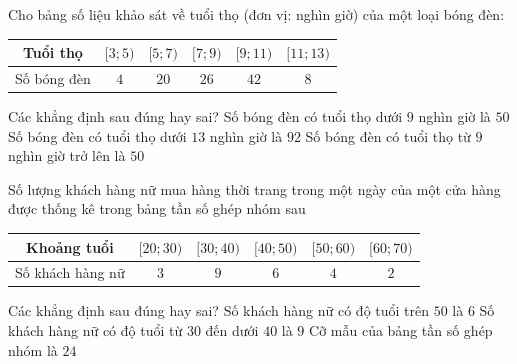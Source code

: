 \begin{ex}%
Cho bảng số liệu khảo sát về tuổi thọ (đơn vị: nghìn giờ) của một loại bóng đèn:
\begin{longtable}{|c|c|c|c|c|c|}
\hline Tuổi thọ &$[3 ; 5)$&$[5 ; 7)$&$[7 ; 9)$&$[9 ; 11)$&$[11 ; 13)$\\
\hline Số bóng đèn & $4$ & $20$ & $26$ & $42$ & $8$ \\
\hline
\end{longtable}
Các khẳng định sau đúng hay sai? 
{\True Số bóng đèn có tuổi thọ dưới $9$ nghìn giờ là $50$}
{Số bóng đèn có tuổi thọ dưới $13$ nghìn giờ là $92$}
{\True Số bóng đèn có tuổi thọ từ $9$ nghìn giờ trở lên là $50$}
\end{ex}

\begin{ex}%
Số lượng khách hàng nữ mua hàng thời trang trong một ngày của một cửa hàng được thống kê trong bảng tần số ghép nhóm sau

\begin{center}
\begin{tabular}{|c|c|c|c|c|c|}
\hline Khoảng tuổi & $[20 ; 30)$ & $[30 ; 40)$ & $[40 ; 50)$ & $[50 ; 60)$ & $[60 ; 70)$ \\
\hline Số khách hàng nữ & $3$ & $9$ & $6$ & $4$ & $2$ \\
\hline
\end{tabular}
\end{center}
Các khẳng định sau đúng hay sai? 
{\True Số khách hàng nữ có độ tuổi trên  $50$ là $ 6$}
{\True Số khách hàng nữ có độ tuổi từ $30$ đến dưới $40$ là $9$}
{\True Cỡ mẫu của bảng tần số ghép nhóm là $ 24$}
\end{ex}


